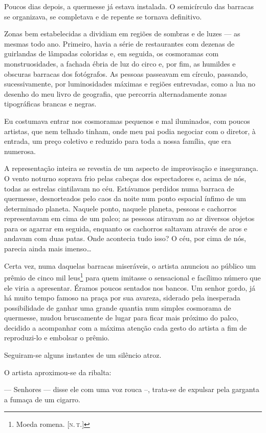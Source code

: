 Poucos dias depois, a quermesse já estava instalada. O semicírculo das barracas se organizava, se completava e de repente se tornava definitivo.

Zonas bem estabelecidas a dividiam em regiões de sombras e de luzes --- as mesmas todo ano. Primeiro, havia a série de restaurantes com dezenas de guirlandas de lâmpadas coloridas e, em seguida, os cosmoramas com monstruosidades, a fachada ébria de luz do circo e, por fim, as humildes e obscuras barracas dos fotógrafos. As pessoas passeavam em círculo, passando, sucessivamente, por luminosidades máximas e regiões entrevadas, como a lua no desenho do meu livro de geografia, que percorria alternadamente zonas tipográficas brancas e negras.

Eu costumava entrar nos cosmoramas pequenos e mal iluminados, com poucos artistas, que nem telhado tinham, onde meu pai podia negociar com o diretor, à entrada, um preço coletivo e reduzido para toda a nossa família, que era numerosa.

A representação inteira se revestia de um aspecto de improvisação e insegurança. O vento noturno soprava frio pelas cabeças dos espectadores e, acima de nós, todas as estrelas cintilavam no céu. Estávamos perdidos numa barraca de quermesse, desnorteados pelo caos da noite num ponto espacial ínfimo de um determinado planeta. Naquele ponto, naquele planeta, pessoas e cachorros representavam em cima de um palco; as pessoas atiravam ao ar diversos objetos para os agarrar em seguida, enquanto os cachorros saltavam através de aros e andavam com duas patas. Onde acontecia tudo isso? O céu, por cima de nós, parecia ainda mais imenso\ldots{}

Certa vez, numa daquelas barracas miseráveis, o artista anunciou ao público um prêmio de cinco mil leus\footnote{Moeda romena. {[}\textsc{n.\,t.}{]}} para quem imitasse o sensacional e facílimo número que ele viria a apresentar. Éramos poucos sentados nos bancos. Um senhor gordo, já há muito tempo famoso na praça por sua avareza, siderado pela inesperada possibilidade de ganhar uma grande quantia num simples cosmorama de quermesse, mudou bruscamente de lugar para ficar mais próximo do palco, decidido a acompanhar com a máxima atenção cada gesto do artista a fim de reproduzi-lo e embolsar o prêmio.

Seguiram-se alguns instantes de um silêncio atroz.

O artista aproximou-se da ribalta: 

--- Senhores --- disse ele com uma voz rouca --, trata-se de expulsar pela garganta a fumaça de um cigarro. 

